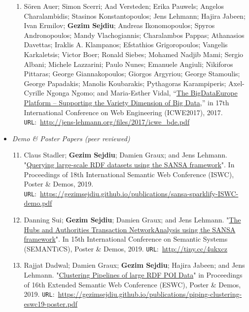 \begin{itemize}
\begin{enumerate}
    \item Sören Auer; Simon Scerri; Aad Versteden; Erika Pauwels; Angelos Charalambidis; Stasinos Konstantopoulos; Jens Lehmann; Hajira Jabeen; Ivan Ermilov; \textbf{Gezim Sejdiu}; Andreas Ikonomopoulos; Spyros Andronopoulos; Mandy Vlachogiannis; Charalambos Pappas; Athanasios Davettas; Iraklis A. Klampanos; Efstathios Grigoropoulos; Vangelis Karkaletsis; Victor Boer; Ronald Siebes; Mohamed Nadjib Mami; Sergio Albani; Michele Lazzarini; Paulo Nunes; Emanuele Angiuli; Nikiforos Pittaras; George Giannakopoulos; Giorgos Argyriou; George Stamoulis; George Papadakis; Manolis Koubarakis; Pythagoras Karampiperis; Axel-Cyrille Ngonga Ngomo; and Maria-Esther Vidal, “\href{http://jens-lehmann.org/files/2017/icwe_bde.pdf}{The BigDataEurope Platform – Supporting the Variety Dimension of Big Data},” in 17th International Conference on Web Engineering (ICWE2017), 2017. \texttt{URL}:~\url{http://jens-lehmann.org/files/2017/icwe_bde.pdf}
     
\end{enumerate}
    
    \item \emph{Demo \& Poster Papers (peer reviewed)}
    
    \begin{enumerate}
    \setcounter{enumi}{10}

    \item Claus Stadler; \textbf{Gezim Sejdiu}; Damien Graux; and Jens Lehmann. "\href{https://gezimsejdiu.github.io/publications/sansa-sparklify-ISWC-demo.pdf}{Querying large-scale RDF datasets using the SANSA framework}".  In Proceedings of 18th International Semantic Web Conference (ISWC), Poster \& Demos, 2019. \texttt{URL}:~\url{https://gezimsejdiu.github.io/publications/sansa-sparklify-ISWC-demo.pdf}

    \item Danning Sui; \textbf{Gezim Sejdiu}; Damien Graux; and Jens Lehmann. "\href{https://gezimsejdiu.github.io/publications/sansa-hubs-and-authorities-transaction-semantics19-poster.pdf}{The Hubs and Authorities Transaction NetworkAnalysis using the SANSA framework}".  In 15th International Conference on Semantic Systems (SEMANTiCS), Poster \& Demos, 2019. \texttt{URL}:~\url{http://tiny.cc/4ukxcz}

    \item Rajjat Dadwal; Damien Graux; \textbf{Gezim Sejdiu}; Hajira Jabeen; and Jens Lehmann. "\href{https://gezimsejdiu.github.io/publications/piping-clustering-eswc19-poster.pdf}{Clustering Pipelines of large RDF POI Data}" in Proceedings of 16th Extended Semantic Web Conference (ESWC), Poster \& Demos, 2019. \texttt{URL}:~\url{https://gezimsejdiu.github.io/publications/piping-clustering-eswc19-poster.pdf}
    

\end{enumerate}
\end{itemize}
